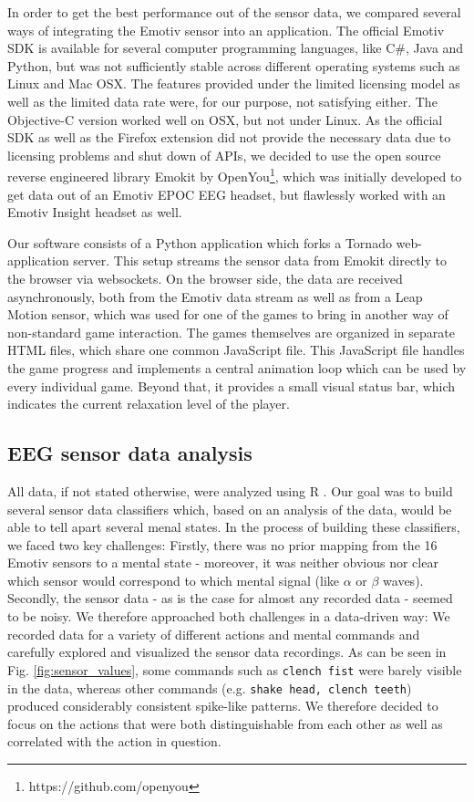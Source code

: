 \documentclass{utue} %
\begin{document}
In order to get the best performance out of the sensor data, we compared several ways of integrating the Emotiv sensor into an application. The official Emotiv SDK is available for several computer programming languages, like C\#, Java and Python, but was not sufficiently stable across different operating systems such as Linux and Mac OSX. The features provided under the limited licensing model as well as the limited data rate were, for our purpose, not satisfying either. The Objective-C version worked well on OSX, but not under Linux. As the official SDK as well as the Firefox extension did not provide the necessary data due to licensing problems and shut down of APIs, we decided to use the open source reverse engineered library Emokit by OpenYou\footnote{https://github.com/openyou}, which was initially developed to get data out of an Emotiv EPOC EEG headset, but flawlessly worked with an Emotiv Insight headset as well.

Our software consists of a Python application which forks a Tornado web-application server. This setup streams the sensor data from Emokit directly to the browser via websockets. On the browser side, the data are received asynchronously, both from the Emotiv data stream as well as from a Leap Motion sensor, which was used for one of the games to bring in another way of non-standard game interaction. The games themselves are organized in separate HTML files, which share one common JavaScript file. This JavaScript file handles the game progress and implements a central animation loop which can be used by every individual game. Beyond that, it provides a small visual status bar, which indicates the current relaxation level of the player.

\subsection{EEG sensor data analysis}
All data, if not stated otherwise, were analyzed using R \cite{RCoreTeam}. Our goal was to build several sensor data classifiers which, based on an analysis of the data, would be able to tell apart several menal states. In the process of building these classifiers, we faced two key challenges: Firstly, there was no prior mapping from the 16 Emotiv sensors to a mental state - moreover, it was neither obvious nor clear which sensor would correspond to which mental signal (like $ \alpha $ or $ \beta $ waves). Secondly, the sensor data - as is the case for almost any recorded data - seemed to be noisy. We therefore approached both challenges in a data-driven way: We recorded data for a variety of different actions and mental commands and carefully explored and visualized the sensor data recordings. As can be seen in Fig. \ref{fig:sensor_values}, some commands such as \texttt{clench fist} were barely visible in the data, whereas other commands (e.g. \texttt{shake head, clench teeth}) produced considerably consistent spike-like patterns. We therefore decided to focus on the actions that were both distinguishable from each other as well as correlated with the action in question.
\end{document}
